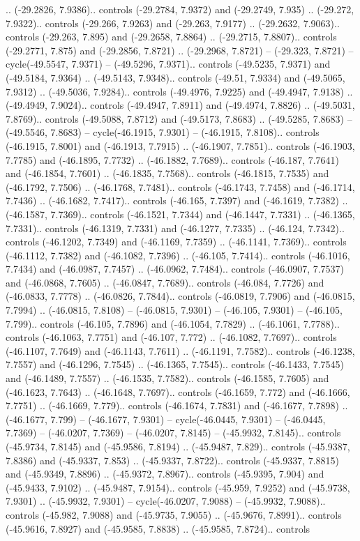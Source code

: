 \begin{scope}[shift={(2.5552, 9.9912)}]
\begin{scope}[shift={(48.1654, -14.8546)}]
.. (-29.2826, 7.9386).. controls (-29.2784, 7.9372) and (-29.2749, 7.935) .. (-29.272, 7.9322).. controls (-29.266, 7.9263) and (-29.263, 7.9177) .. (-29.2632, 7.9063).. controls (-29.263, 7.895) and (-29.2658, 7.8864) .. (-29.2715, 7.8807).. controls (-29.2771, 7.875) and (-29.2856, 7.8721) .. (-29.2968, 7.8721) -- (-29.323, 7.8721) -- cycle(-49.5547, 7.9371) -- (-49.5296, 7.9371).. controls (-49.5235, 7.9371) and (-49.5184, 7.9364) .. (-49.5143, 7.9348).. controls (-49.51, 7.9334) and (-49.5065, 7.9312) .. (-49.5036, 7.9284).. controls (-49.4976, 7.9225) and (-49.4947, 7.9138) .. (-49.4949, 7.9024).. controls (-49.4947, 7.8911) and (-49.4974, 7.8826) .. (-49.5031, 7.8769).. controls (-49.5088, 7.8712) and (-49.5173, 7.8683) .. (-49.5285, 7.8683) -- (-49.5546, 7.8683) -- cycle(-46.1915, 7.9301) -- (-46.1915, 7.8108).. controls (-46.1915, 7.8001) and (-46.1913, 7.7915) .. (-46.1907, 7.7851).. controls (-46.1903, 7.7785) and (-46.1895, 7.7732) .. (-46.1882, 7.7689).. controls (-46.187, 7.7641) and (-46.1854, 7.7601) .. (-46.1835, 7.7568).. controls (-46.1815, 7.7535) and (-46.1792, 7.7506) .. (-46.1768, 7.7481).. controls (-46.1743, 7.7458) and (-46.1714, 7.7436) .. (-46.1682, 7.7417).. controls (-46.165, 7.7397) and (-46.1619, 7.7382) .. (-46.1587, 7.7369).. controls (-46.1521, 7.7344) and (-46.1447, 7.7331) .. (-46.1365, 7.7331).. controls (-46.1319, 7.7331) and (-46.1277, 7.7335) .. (-46.124, 7.7342).. controls (-46.1202, 7.7349) and (-46.1169, 7.7359) .. (-46.1141, 7.7369).. controls (-46.1112, 7.7382) and (-46.1082, 7.7396) .. (-46.105, 7.7414).. controls (-46.1016, 7.7434) and (-46.0987, 7.7457) .. (-46.0962, 7.7484).. controls (-46.0907, 7.7537) and (-46.0868, 7.7605) .. (-46.0847, 7.7689).. controls (-46.084, 7.7726) and (-46.0833, 7.7778) .. (-46.0826, 7.7844).. controls (-46.0819, 7.7906) and (-46.0815, 7.7994) .. (-46.0815, 7.8108) -- (-46.0815, 7.9301) -- (-46.105, 7.9301) -- (-46.105, 7.799).. controls (-46.105, 7.7896) and (-46.1054, 7.7829) .. (-46.1061, 7.7788).. controls (-46.1063, 7.7751) and (-46.107, 7.772) .. (-46.1082, 7.7697).. controls (-46.1107, 7.7649) and (-46.1143, 7.7611) .. (-46.1191, 7.7582).. controls (-46.1238, 7.7557) and (-46.1296, 7.7545) .. (-46.1365, 7.7545).. controls (-46.1433, 7.7545) and (-46.1489, 7.7557) .. (-46.1535, 7.7582).. controls (-46.1585, 7.7605) and (-46.1623, 7.7643) .. (-46.1648, 7.7697).. controls (-46.1659, 7.772) and (-46.1666, 7.7751) .. (-46.1669, 7.779).. controls (-46.1674, 7.7831) and (-46.1677, 7.7898) .. (-46.1677, 7.799) -- (-46.1677, 7.9301) -- cycle(-46.0445, 7.9301) -- (-46.0445, 7.7369) -- (-46.0207, 7.7369) -- (-46.0207, 7.8145) -- (-45.9932, 7.8145).. controls (-45.9734, 7.8145) and (-45.9586, 7.8194) .. (-45.9487, 7.829).. controls (-45.9387, 7.8386) and (-45.9337, 7.853) .. (-45.9337, 7.8722).. controls (-45.9337, 7.8815) and (-45.9349, 7.8896) .. (-45.9372, 7.8967).. controls (-45.9395, 7.904) and (-45.9433, 7.9102) .. (-45.9487, 7.9154).. controls (-45.959, 7.9252) and (-45.9738, 7.9301) .. (-45.9932, 7.9301) -- cycle(-46.0207, 7.9088) -- (-45.9932, 7.9088).. controls (-45.982, 7.9088) and (-45.9735, 7.9055) .. (-45.9676, 7.8991).. controls (-45.9616, 7.8927) and (-45.9585, 7.8838) .. (-45.9585, 7.8724).. controls 
\end{scope}
\end{scope}
